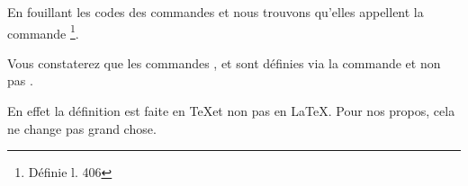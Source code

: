 En fouillant les codes des commandes  et  nous trouvons qu'elles appellent la commande \footnote{Définie l. 406}.

\begin{anedocte}
Vous constaterez que les commandes ,  et  sont définies via la commande  et non pas . 

En effet la définition est faite en \TeX et non pas en \LaTeX. Pour nos propos, cela ne change pas grand chose.
\end{anedocte} 


